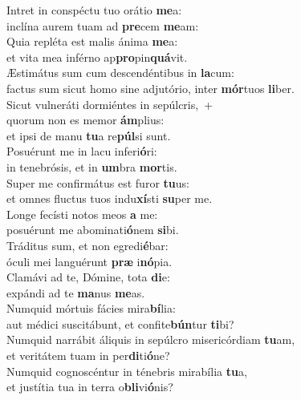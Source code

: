 \evenverse Intret in conspéctu tuo orátio \textbf{me}a:~\*\\
\evenverse inclína aurem tuam ad \textbf{pre}cem \textbf{me}am:\\
\oddverse Quia repléta est malis ánima \textbf{me}a:~\*\\
\oddverse et vita mea inférno ap\textbf{pro}pin\textbf{quá}vit.\\
\evenverse Æstimátus sum cum descendéntibus in \textbf{la}cum:~\*\\
\evenverse factus sum sicut homo sine adjutório, inter \textbf{mór}tuos \textbf{li}ber.\\
\oddverse Sicut vulneráti dormiéntes in sepúlcris,~+\\
\oddverse  quorum non es memor \textbf{ám}plius:~\*\\
\oddverse et ipsi de manu \textbf{tu}a re\textbf{púl}si sunt.\\
\evenverse Posuérunt me in lacu inferi\textbf{ó}ri:~\*\\
\evenverse in tenebrósis, et in \textbf{um}bra \textbf{mor}tis.\\
\oddverse Super me confirmátus est furor \textbf{tu}us:~\*\\
\oddverse et omnes fluctus tuos indu\textbf{xí}sti \textbf{su}per me.\\
\evenverse Longe fecísti notos meos \textbf{a} me:~\*\\
\evenverse posuérunt me abominati\textbf{ó}nem \textbf{si}bi.\\
\oddverse Tráditus sum, et non egredi\textbf{é}bar:~\*\\
\oddverse óculi mei languérunt \textbf{præ} i\textbf{nó}pia.\\
\evenverse Clamávi ad te, Dómine, tota \textbf{di}e:~\*\\
\evenverse expándi ad te \textbf{ma}nus \textbf{me}as.\\
\oddverse Numquid mórtuis fácies mira\textbf{bí}lia:~\*\\
\oddverse aut médici suscitábunt, et confite\textbf{bún}tur \textbf{ti}bi?\\
\evenverse Numquid narrábit áliquis in sepúlcro misericórdiam \textbf{tu}am,~\*\\
\evenverse et veritátem tuam in per\textbf{di}ti\textbf{ó}ne?\\
\oddverse Numquid cognoscéntur in ténebris mirabília \textbf{tu}a,~\*\\
\oddverse et justítia tua in terra o\textbf{bli}vi\textbf{ó}nis?\\
